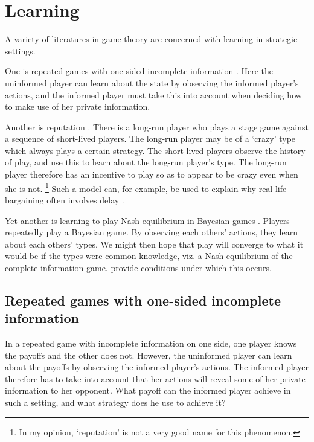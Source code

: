 \documentclass[11pt,letterpaper,reqno,oneside]{article}
\begin{document}
\section{Learning}
\label{sec:learning}

A variety of literatures in game theory are concerned with learning in strategic settings.

One is repeated games with one-sided incomplete information \parencite{AumannMaschler1995}. Here the uninformed player can learn about the state by observing the informed player's actions, and the informed player must take this into account when deciding how to make use of her private information.

Another is reputation \parencite{FudenbergLevine1989,FudenbergLevine1992}. There is a long-run player who plays a stage game against a sequence of short-lived players. The long-run player may be of a `crazy' type which always plays a certain strategy. The short-lived players observe the history of play, and use this to learn about the long-run player's type. The long-run player therefore has an incentive to play so as to appear to be crazy even when she is not.%
	\footnote{In my opinion, `reputation' is not a very good name for this phenomenon.}
Such a model can, for example, be used to explain why real-life bargaining often involves delay \parencite{AbreuGul2000}.

Yet another is learning to play Nash equilibrium in Bayesian games \parencite{KalaiLehrer1993}. Players repeatedly play a Bayesian game. By observing each others' actions, they learn about each others' types. We might then hope that play will converge to what it would be if the types were common knowledge, viz. a Nash equilibrium of the complete-information game. \textcite{KalaiLehrer1993} provide conditions under which this occurs.



\subsection{Repeated games with one-sided incomplete information}
\label{sec:learning:AumannMaschler}

In a repeated game with incomplete information on one side, one player knows the payoffs and the other does not. However, the uninformed player can learn about the payoffs by observing the informed player's actions. The informed player therefore has to take into account that her actions will reveal some of her private information to her opponent. What payoff can the informed player achieve in such a setting, and what strategy does he use to achieve it?
\end{document}
